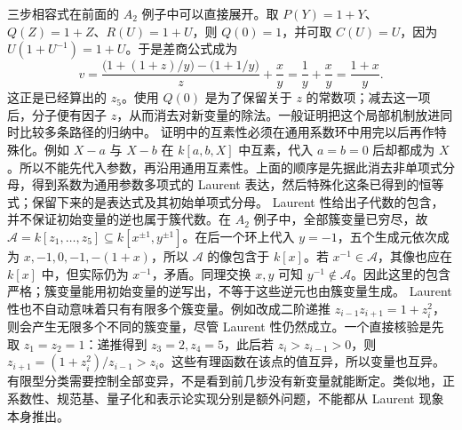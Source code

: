 三步相容式在前面的 \(A_2\) 例子中可以直接展开。取 \(P(Y)=1+Y\)、\(Q(Z)=1+Z\)、\(R(U)=1+U\)，则 \(Q(0)=1\)，并可取 \(C(U)=U\)，因为 \(U(1+U^{-1})=1+U\)。于是差商公式成为
\[
	v=\frac{\bigl(1+(1+z)/y\bigr)-\bigl(1+1/y\bigr)}{z}+\frac{x}{y} =\frac1y+\frac xy=\frac{1+x}{y}.
\]
这正是已经算出的 \(z_5\)。使用 \(Q(0)\) 是为了保留关于 \(z\) 的常数项；减去这一项后，分子便有因子 \(z\)，从而消去对新变量的除法。一般证明把这个局部机制放进同时比较多条路径的归纳中。
\ProseParagraphBreak
证明中的互素性必须在通用系数环中用完以后再作特殊化。例如 \(X-a\) 与 \(X-b\) 在 \(k[a,b,X]\) 中互素，代入 \(a=b=0\) 后却都成为 \(X\)。所以不能先代入参数，再沿用通用互素性。上面的顺序是先据此消去非单项式分母，得到系数为通用参数多项式的 Laurent 表达，然后特殊化这条已得到的恒等式；保留下来的是表达式及其初始单项式分母。
\ProseParagraphBreak
Laurent 性给出子代数的包含，并不保证初始变量的逆也属于簇代数。在 \(A_2\) 例子中，全部簇变量已穷尽，故 \(\mathcal A=k[z_1,\ldots,z_5]\subseteq k[x^{\pm1},y^{\pm1}]\)。在后一个环上代入 \(y=-1\)，五个生成元依次成为 \(x,-1,0,-1,-(1+x)\)，所以 \(\mathcal A\) 的像包含于 \(k[x]\)。若 \(x^{-1}\in\mathcal A\)，其像也应在 \(k[x]\) 中，但实际仍为 \(x^{-1}\)，矛盾。同理交换 \(x,y\) 可知 \(y^{-1}\notin\mathcal A\)。因此这里的包含严格；簇变量能用初始变量的逆写出，不等于这些逆元也由簇变量生成。
\ProseParagraphBreak
Laurent 性也不自动意味着只有有限多个簇变量。例如改成二阶递推 \(z_{i-1}z_{i+1}=1+z_i^2\)，则会产生无限多个不同的簇变量，尽管 Laurent 性仍然成立。一个直接核验是先取 \(z_1=z_2=1\)：递推得到 \(z_3=2,z_4=5\)，此后若 \(z_i>z_{i-1}>0\)，则 \(z_{i+1}=(1+z_i^2)/z_{i-1}>z_i\)。这些有理函数在该点的值互异，所以变量也互异。有限型分类需要控制全部变异，不是看到前几步没有新变量就能断定。类似地，正系数性、规范基、量子化和表示论实现分别是额外问题，不能都从 Laurent 现象本身推出。
